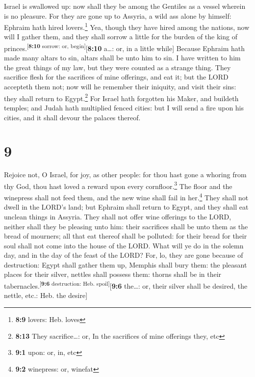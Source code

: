  Israel is swallowed up: now shall they be among the
Gentiles as a vessel wherein is no pleasure.  For they are
gone up to Assyria, a wild ass alone by himself: Ephraim hath hired
lovers.\footnote{\textbf{8:9} lovers: Heb. loves}  Yea,
though they have hired among the nations, now will I gather them, and
they shall sorrow a little for the burden of the king of
princes.\textsuperscript{{[}\textbf{8:10} sorrow: or,
begin{]}}{[}\textbf{8:10} a\ldots: or, in a little while{]}
 Because Ephraim hath made many altars to sin, altars
shall be unto him to sin.  I have written to him the
great things of my law, but they were counted as a strange thing.
 They sacrifice flesh for the sacrifices of mine
offerings, and eat it; but the LORD accepteth them not; now will he
remember their iniquity, and visit their sins: they shall return to
Egypt.\footnote{\textbf{8:13} They sacrifice\ldots: or, In the
  sacrifices of mine offerings they, etc}  For Israel
hath forgotten his Maker, and buildeth temples; and Judah hath
multiplied fenced cities: but I will send a fire upon his cities, and it
shall devour the palaces thereof.

\hypertarget{section-8}{%
\section{9}\label{section-8}}

 Rejoice not, O Israel, for joy, as other people: for thou
hast gone a whoring from thy God, thou hast loved a reward upon every
cornfloor.\footnote{\textbf{9:1} upon: or, in, etc}  The
floor and the winepress shall not feed them, and the new wine shall fail
in her.\footnote{\textbf{9:2} winepress: or, winefat} 
They shall not dwell in the LORD's land; but Ephraim shall return to
Egypt, and they shall eat unclean things in Assyria.  They
shall not offer wine offerings to the LORD, neither shall they be
pleasing unto him: their sacrifices shall be unto them as the bread of
mourners; all that eat thereof shall be polluted: for their bread for
their soul shall not come into the house of the LORD. 
What will ye do in the solemn day, and in the day of the feast of the
LORD?  For, lo, they are gone because of destruction:
Egypt shall gather them up, Memphis shall bury them: the pleasant places
for their silver, nettles shall possess them: thorns shall be in their
tabernacles.\textsuperscript{{[}\textbf{9:6} destruction: Heb.
spoil{]}}{[}\textbf{9:6} the\ldots: or, their silver shall be desired,
the nettle, etc.: Heb. the desire{]}

